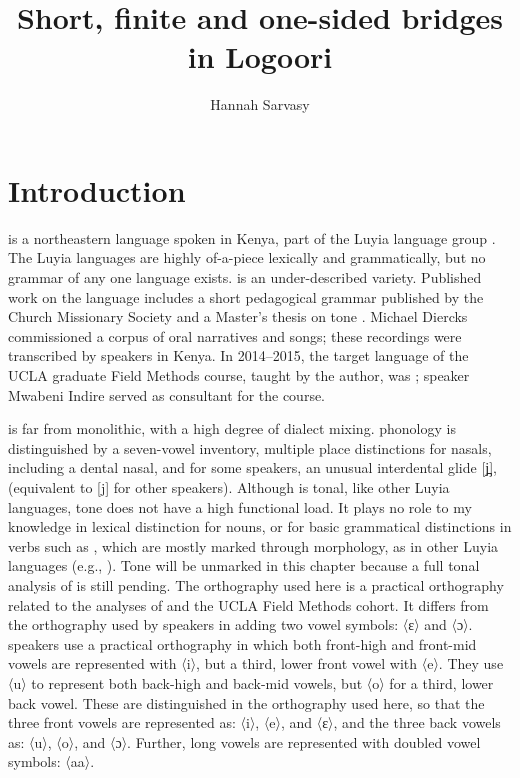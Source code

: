 \documentclass[output=paper]{LSP/langsci}
\author{
  Hannah Sarvasy\affiliation{MARCS Institute, Western Sydney University}
}
\title{Short, finite and one-sided bridges in Logoori}
\begin{document}
\label{ch:3}
\section{Introduction}
\label{Saintro}
 is a northeastern  language spoken in Kenya, part of the Luyia language group \citep{Mould1981}. The Luyia languages are highly of-a-piece lexically and grammatically, but no grammar of any one language exists.  is an under-described variety. Published work on the language includes a short pedagogical grammar published by the Church Missionary Society \citep{Appleby1961} and a Master’s thesis on  tone \citep{Leung1991}. Michael Diercks commissioned a corpus of  oral narratives and songs; these recordings were transcribed by  speakers in Kenya. In 2014--2015, the target language of the UCLA graduate Field Methods course, taught by the author, was ; speaker Mwabeni Indire served as consultant for the course. 

 is far from monolithic, with a high degree of dialect mixing.  phonology is distinguished by a seven-vowel inventory, multiple place distinctions for nasals, including a dental nasal, and for some speakers, an unusual interdental glide [j̪], (equivalent to [j] for other speakers). Although  is tonal, like other Luyia languages, tone does not have a high functional load. It plays no role to my knowledge in lexical distinction for nouns, or for basic grammatical distinctions in verbs such as , which are mostly marked through morphology, as in other Luyia languages (e.g.,  \citealt{Marlo2008}). Tone will be unmarked in this chapter because a full tonal analysis of  is still pending. The orthography used here is a practical orthography related to the analyses of \citet{Leung1991} and the UCLA Field Methods cohort. It differs from the orthography used by speakers in adding two vowel symbols: 〈ɛ〉 and 〈ɔ〉.  speakers use a practical orthography in which both front-high and front-mid vowels are represented with 〈i〉, but a third, lower front vowel with 〈e〉. They use 〈u〉 to represent both back-high and back-mid vowels, but 〈o〉 for a third, lower back vowel. These are distinguished in the orthography used here, so that the three front vowels are represented as: 〈i〉, 〈e〉, and 〈ɛ〉, and the three back vowels as: 〈u〉, 〈o〉, and 〈ɔ〉. Further, long vowels are represented with doubled vowel symbols: 〈aa〉. 
\end{document}
